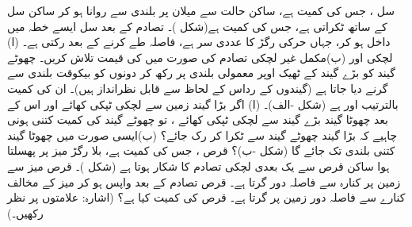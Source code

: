 سل ، جس کی کمیت  ہے، ساکن حالت سے میلان پر  بلندی سے روانا ہو کر ساکن  سل   کے ساتھ ٹکراتی ہے، جس کی کمیت  ہے(شکل )۔ تصادم کے بعد سل  ایسے خطہ میں داخل ہو کر، جہاں حرکی رگڑ کا عددی سر  ہے،  فاصلہ  طے کرنے کے بعد رکتی ہے۔ (ا) لچکی اور (ب)مکمل  غیر لچکی  تصادم کی صورت میں  کی قیمت تلاش کریں۔
چھوٹے گیند کو بڑے گیند کے ٹھیک اوپر  معمولی  بلندی پر  رکھ کر دونوں کو بیکوقت  بلندی سے  گرنے دیا جاتا ہے (گیندوں کے رداس   کے لحاظ سے قابل نظرانداز ہیں)۔ ان کی کمیت بالترتیب  اور  ہے (شکل -الف)۔ (ا) اگر   بڑا گیند زمین سے لچکی ٹپکی کھائے اور  اس کے بعد چھوٹا گیند  بڑے گیند سے لچکی ٹپکی کھائے ، تو چھوٹے گیند کی کمیت  کتنی  ہونی چاہیے کہ بڑا گیند  چھوٹے گیند سے ٹکرا کر رک جائے؟ (ب)ایسی صورت میں   چھوٹا گیند  کتنی بلندی تک جائے گا  (شکل -ب)؟
قرص ، جس کی کمیت  ہے،  بلا رگڑ میز پر پھسلتا ہوا  ساکن قرص  سے یک بعدی لچکی تصادم کا شکار ہوتا  ہے (شکل )۔ قرص  میز سے زمین پر کنارہ سے  فاصلہ دور گرتا ہے۔ قرص    تصادم کے بعد واپس  ہو کر  میز کے مخالف کنارے سے  فاصلہ دور زمین پر گرتا ہے۔ قرص  کی کمیت کیا ہے؟ (اشارہ: علامتوں پر نظر رکھیں۔)

